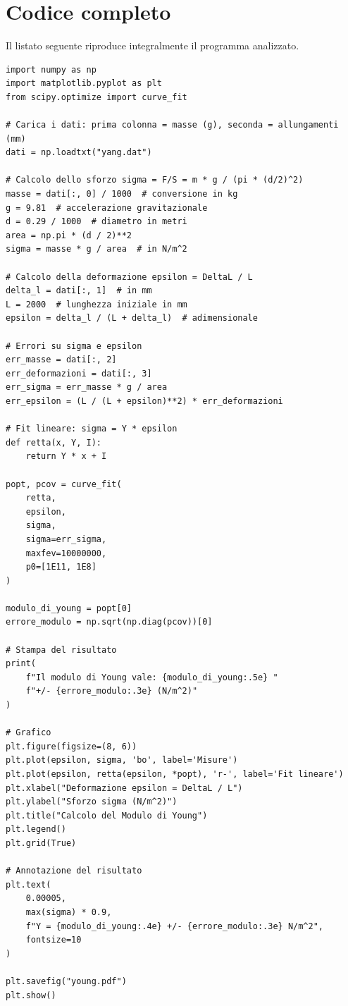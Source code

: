 \documentclass[11pt,a4paper]{book}
\begin{document}
\section{Codice completo}

Il listato seguente riproduce integralmente il programma analizzato.

\begin{lstlisting}[caption={Codice completo del programma \texttt{young.py}},label={lst:young}]
import numpy as np
import matplotlib.pyplot as plt
from scipy.optimize import curve_fit

# Carica i dati: prima colonna = masse (g), seconda = allungamenti (mm)
dati = np.loadtxt("yang.dat")

# Calcolo dello sforzo sigma = F/S = m * g / (pi * (d/2)^2)
masse = dati[:, 0] / 1000  # conversione in kg
g = 9.81  # accelerazione gravitazionale
d = 0.29 / 1000  # diametro in metri
area = np.pi * (d / 2)**2
sigma = masse * g / area  # in N/m^2

# Calcolo della deformazione epsilon = DeltaL / L
delta_l = dati[:, 1]  # in mm
L = 2000  # lunghezza iniziale in mm
epsilon = delta_l / (L + delta_l)  # adimensionale

# Errori su sigma e epsilon
err_masse = dati[:, 2]
err_deformazioni = dati[:, 3]
err_sigma = err_masse * g / area
err_epsilon = (L / (L + epsilon)**2) * err_deformazioni

# Fit lineare: sigma = Y * epsilon
def retta(x, Y, I):
    return Y * x + I

popt, pcov = curve_fit(
    retta,
    epsilon,
    sigma,
    sigma=err_sigma,
    maxfev=10000000,
    p0=[1E11, 1E8]
)

modulo_di_young = popt[0]
errore_modulo = np.sqrt(np.diag(pcov))[0]

# Stampa del risultato
print(
    f"Il modulo di Young vale: {modulo_di_young:.5e} "
    f"+/- {errore_modulo:.3e} (N/m^2)"
)

# Grafico
plt.figure(figsize=(8, 6))
plt.plot(epsilon, sigma, 'bo', label='Misure')
plt.plot(epsilon, retta(epsilon, *popt), 'r-', label='Fit lineare')
plt.xlabel("Deformazione epsilon = DeltaL / L")
plt.ylabel("Sforzo sigma (N/m^2)")
plt.title("Calcolo del Modulo di Young")
plt.legend()
plt.grid(True)

# Annotazione del risultato
plt.text(
    0.00005,
    max(sigma) * 0.9,
    f"Y = {modulo_di_young:.4e} +/- {errore_modulo:.3e} N/m^2",
    fontsize=10
)

plt.savefig("young.pdf")
plt.show()
\end{lstlisting}
\end{document}
